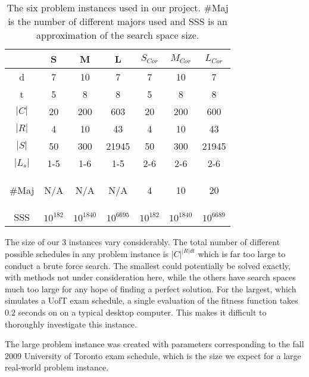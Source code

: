 \documentclass[letterpaper]{article}
\begin{document}
    \begin{table}[h]
    \begin{small}
    \begin{tabular}{*{7}{c}}
    \hline 
 	  	& S 	& M 	& L 	& $S_{Cor}$ & $M_{Cor}$ & $L_{Cor}$ \\ 
    \hline \hline
     d 		& 7 	& 10	& 7 	& 7 	& 10 	& 7 	\\ 
     t 		& 5		& 8 	& 8 	& 5 	& 8 	& 8 	\\ 
     $|C|$	& 20 	& 200 	& 603 	& 20 	& 200 	& 600 	\\ 
     $|R|$	& 4 	& 10 	& 43 	& 4 	& 10 	& 43	\\ 
     $|S|$	& 50 	& 300 	& 21945 & 50 	& 300 	& 21945	\\ 
     $|L_s|$	& 1-5 	& 1-6 	& 1-5 	& 2-6 	& 2-6 	& 2-6 	\\ 
     \begin{tiny}$\#$Maj\end{tiny}	& N/A 	& N/A 	& N/A 	& 4 	& 10 	& 20 	\\ 
     \textsc{SSS}	& $10^{182}$ & $10^{1840}$ & $10^{6695}$ & $10^{182}$ & $10^{1840}$ & $10^{6689}$ \\
    \hline  
    \end{tabular} 
	\end{small}
	\caption{The six problem instances used in our project. $\#$Maj is the number of different 
	         majors used and \textsc{SSS} is an approximation of the search space size.}
	\end{table}
	  
    The size of our 3 instances vary considerably. The total number of different possible
    schedules in any problem instance is $|C|^{|R|dt}$ which is far too large to conduct
    a brute force search. The smallest could potentially be solved exactly, with methods
    not under consideration here, while the others have search spaces much too large 
    for any hope of finding a perfect solution. For the largest, which simulates a UofT 
    exam schedule, a single evaluation of the fitness function takes 0.2 seconds on on 
    a typical desktop computer. This makes it difficult to thoroughly investigate this 
    instance.
    
    The large problem instance was created with parameters corresponding to the fall 2009 
	University of Toronto exam schedule, which is the size we expect for a large 
	real-world problem instance.
	
\end{document}
